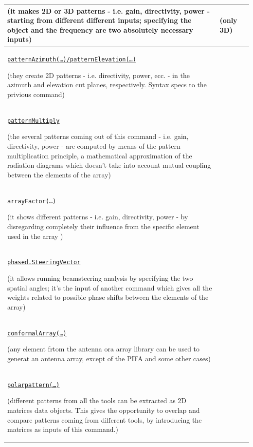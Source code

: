 \documentclass[10pt,a4paper,twocolumn]{article}
\newcommand{\cmark}{\ding{51}}%
\newcommand{\xmark}{\ding{55}}%
\begin{document}
{\begin{table}
\begin{center}
{\begin{tabular}{||m{14cm}|m{1.6cm}|m{1.6cm}||}
{\small{(it makes 2D or 3D patterns - i.e. gain, directivity, power -  starting from different different inputs; 
	specifying the object and the frequency are two absolutely necessary inputs)}}
	& \cmark
	
	(only 3D)& \cmark 
	
	{} \\
	\hline
		\cellcolor{YellowGreen}\underline{\texttt{patternAzimuth(\dots)/patternElevation(\dots)}}
		
		{\small{(they create 2D patterns - i.e. directivity, power, ecc. - in the azimuth and elevation cut planes, respectively. Syntax specs to the privious command)}} & \cmark & \xmark \\
	\hline
			\cellcolor{pink}\underline{\texttt{patternMultiply}}
		
		{\small{(the several patterns coming out of this command - i.e. gain, directivity, power - are computed by means of the pattern multiplication principle, a mathematical approximation of the radiation diagrams which doesn't take into account mutual coupling between the elements of the array)}} & \xmark &\cmark  \\
	\hline
			\cellcolor{YellowGreen}\underline{\texttt{arrayFactor(\dots)}}
		
		{\small{(it shows different patterns - i.e. gain, directivity, power - by disregarding completely their influence from the specific element used in the array )}} &\xmark & \cmark \\
	\hline
		\cellcolor{pink}	\underline{\texttt{phased.SteeringVector}}
		
		{\small{(it allows running beamsteering analysis by specifying the two spatial angles; it's the input of another command which gives all the weights related to possible phase shifts between the elements of the array)}} & \cmark & \xmark \\
	\hline
	\cellcolor{YellowGreen}	\underline{\texttt{conformalArray(\dots)}}
	
	{\small{(any element frtom the antenna ora array library can be used to generat an antenna array, except of the PIFA and some other cases)}} & \cmark & \xmark \\
	\hline
	\cellcolor{pink}	\underline{\texttt{polarpattern(\dots)}}
	
	{\small{(different patterns from all the tools can be extracted as 2D matrices data objects. This gives the opportunity to overlap and compare patterns coming from different tools, by introducing the matrices as inputs of this command.)}} & \cmark & \cmark \\
	\hline
		\end{tabular}}
	\end{center}
	\end{table} 
}
\end{document}
